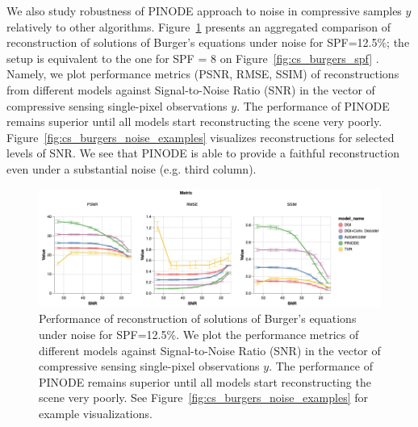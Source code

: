 We also study robustness of PINODE approach to noise in compressive samples $y$ relatively to other algorithms. Figure~\ref{fig:cs_burgers_noise_aggregate} presents an aggregated comparison of reconstruction of solutions of Burger's equations under noise for SPF=12.5\%; the setup is equivalent to the one for SPF = 8 on Figure~\ref{fig:cs_burgers_spf} . Namely, we plot performance metrics (PSNR, RMSE, SSIM) of reconstructions from different models against Signal-to-Noise Ratio (SNR) in the vector of compressive sensing single-pixel observations $y$. The performance of PINODE remains superior until all models start reconstructing the scene very poorly. Figure~\ref{fig:cs_burgers_noise_examples} visualizes reconstructions for selected levels of SNR. We see that PINODE is able to provide a faithful reconstruction even under a substantial noise (e.g. third column).

\begin{figure}
	\centering
	\includegraphics[width=\textwidth]{figures/cs_burgers_noise_aggregate.png}
	\caption{\label{fig:cs_burgers_noise_aggregate} Performance of reconstruction of solutions of Burger's equations under noise for SPF=12.5\%. We plot the performance metrics of different models against Signal-to-Noise Ratio (SNR) in the vector of compressive sensing single-pixel observations $y$. The performance of PINODE remains superior until all models start reconstructing the scene very poorly. See Figure~\ref{fig:cs_burgers_noise_examples} for example visualizations.}
\end{figure}

